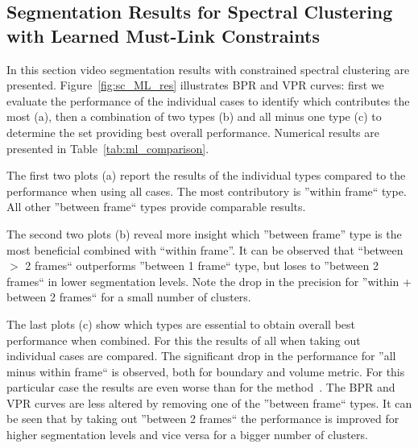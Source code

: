 \subsection{Segmentation Results for Spectral Clustering with Learned Must-Link Constraints}
In this section video segmentation results with constrained spectral clustering are presented.
Figure~\ref{fig:sc_ML_res} illustrates BPR and VPR curves: first we evaluate the performance of the individual cases to identify which contributes the most (a), then a combination of two types (b) and all minus one type (c)
to determine the set providing best overall performance. Numerical results are presented in Table~\ref{tab:ml_comparison}.

The first two plots (a) report the results of the individual types compared to the performance when using all cases. The most contributory is ''within frame`` type. All other ''between frame`` types provide comparable results.

The second two plots (b) reveal more insight which ''between frame'' type is the most beneficial combined with ``within frame''. It can be observed that ``between $>$ 2 frames`` outperforms ''between 1 frame`` type, but 
loses to ''between 2 frames`` in lower segmentation levels. Note the drop in the precision for ''within + between 2 frames`` for a small number of clusters. 

The last plots (c) show which types are essential to obtain overall best performance when combined. For this the results of all when taking out individual cases are compared. The significant drop in the performance
for ''all minus within frame`` is observed, both for boundary and volume metric. For this particular case the results are even worse than for the method~\cite{GalassoCS12}. The BPR and VPR curves are less altered by removing one of the ''between frame`` types. 
It can be seen that by taking out ''between 2 frames`` the performance is improved for higher segmentation levels and vice versa for a bigger number of clusters.

